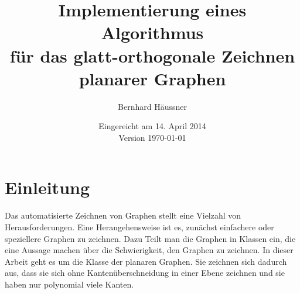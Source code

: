 \documentclass[a4paper]{scrreprt}
\theoremstyle{definition}
\begin{document}


\subject{Bachelorarbeit}
\title{Implementierung eines Algorithmus\\ für das glatt-orthogonale Zeichnen \\ planarer Graphen} %
\author{Bernhard Häussner} %
\date{Eingereicht am 14. April 2014 \\ Version \today} %
\titlehead{Julius-Maximilians-Universität Würzburg\\
Institut für Informatik\\
Lehrstuhl für Informatik I\\
Effiziente Algorithmen und wissensbasierte Systeme}
\publishers{Betreuer:\\
Prof.\ Dr.\ Alexander Wolff\\
Dipl.-Inf.\ Philipp Kindermann} %
\maketitle
\tableofcontents









\chapter{Einleitung}
\label{chap:intro}

Das automatisierte Zeichnen von Graphen stellt eine Vielzahl von Herausforderungen. 
Eine Herangehensweise ist es, zunächst einfachere oder speziellere Graphen zu zeichnen. 
Dazu Teilt man die Graphen in Klassen ein, die eine Aussage machen über die Schwierigkeit, den Graphen zu zeichnen. 
In dieser Arbeit geht es um die Klasse der planaren Graphen. Sie zeichnen sich dadurch aus, dass sie sich ohne Kantenüberschneidung in einer Ebene zeichnen und sie haben nur polynomial viele Kanten. 
\end{document}
